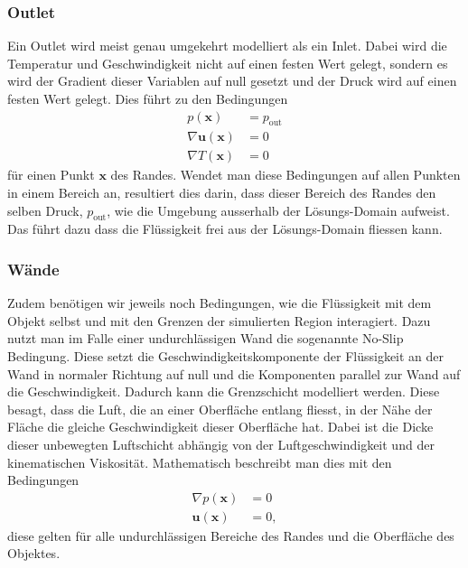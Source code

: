 \subsubsection{Outlet}
%
Ein Outlet wird meist genau umgekehrt modelliert als ein Inlet.
Dabei wird die Temperatur und Geschwindigkeit nicht auf einen festen Wert gelegt, sondern es wird der Gradient dieser Variablen auf null gesetzt und der Druck wird auf einen festen Wert gelegt.
Dies führt zu den Bedingungen
\begin{align*}
 p(\mathbf{x}) &= p_{\text{out}} \\
 \nabla\mathbf{u}(\mathbf{x}) &= 0 \\
 \nabla T(\mathbf{x}) &= 0
\end{align*}
für einen Punkt $\mathbf{x}$ des Randes.
Wendet man diese Bedingungen auf allen Punkten in einem Bereich an, resultiert dies darin, dass dieser Bereich des Randes den selben Druck, $p_{\text{out}}$,  wie die Umgebung ausserhalb der Lösungs-Domain aufweist.
Das führt dazu dass die Flüssigkeit frei aus der Lösungs-Domain fliessen kann.

\subsubsection{Wände}
Zudem benötigen wir jeweils noch Bedingungen, wie die Flüssigkeit mit dem Objekt selbst und mit den Grenzen der simulierten Region interagiert.
Dazu nutzt man im Falle einer undurchlässigen Wand die sogenannte No-Slip Bedingung. 
Diese setzt die Geschwindigkeitskomponente der Flüssigkeit an der Wand in normaler Richtung auf null und die Komponenten parallel zur Wand auf die Geschwindigkeit.
Dadurch kann die Grenzschicht modelliert werden. Diese besagt, dass die Luft, die an einer Oberfläche entlang fliesst, in der Nähe der Fläche die gleiche Geschwindigkeit dieser Oberfläche hat.
Dabei ist die Dicke dieser unbewegten Luftschicht abhängig von der Luftgeschwindigkeit und der kinematischen Viskosität.
Mathematisch beschreibt man dies mit den Bedingungen
\begin{align*}
 \nabla p(\mathbf{x}) &= 0 \\
\mathbf{u}(\mathbf{x}) &= 0 ,
\end{align*}
diese gelten für alle undurchlässigen Bereiche des Randes und die Oberfläche des Objektes.

